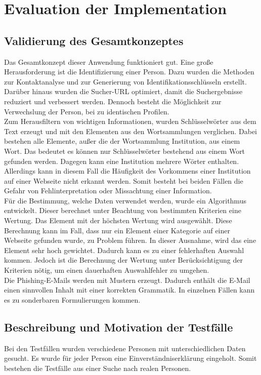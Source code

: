 

\chapter{Evaluation der Implementation}  %
\label{cha:Evaluation der Implementation} %
\section{Validierung des Gesamtkonzeptes}
Das Gesamtkonzept dieser Anwendung funktioniert gut. Eine große Herausforderung ist die Identifizierung einer Person. Dazu wurden die Methoden zur Kontaktanalyse und zur Generierung von Identifikationsschlüsseln erstellt. Darüber hinaus wurden die Sucher-URL optimiert, damit die Suchergebnisse reduziert und verbessert werden. Dennoch besteht die Möglichkeit zur Verwechslung der Person, bei zu identischen Profilen.\\
Zum Herausfiltern von wichtigen Informationen, wurden Schlüsselwörter aus dem Text erzeugt und mit den Elementen aus den Wortsammlungen verglichen. Dabei bestehen alle Elemente, außer die der Wortsammlung Institution, aus einem Wort. Das bedeutet es können nur Schlüsselwörter bestehend aus einem Wort gefunden werden. Dagegen kann eine Institution mehrere Wörter enthalten. Allerdings kann in diesem Fall die Häufigkeit des Vorkommens einer Institution auf einer Webseite nicht erkannt werden. Somit besteht bei beiden Fällen die Gefahr von Fehlinterpretation oder Missachtung einer Information.\\
Für die Bestimmung, welche Daten verwendet werden, wurde ein Algorithmus entwickelt. Dieser berechnet unter Beachtung von bestimmten Kriterien eine Wertung. Das Element mit der höchsten Wertung wird ausgewählt. Diese Berechnung kann im Fall, dass nur ein Element einer Kategorie auf einer Webseite gefunden wurde, zu Problem führen. In dieser Ausnahme, wird das eine Element sehr hoch gewichtet. Dadurch kann es zu einer fehlerhaften Auswahl kommen. Jedoch ist die Berechnung der Wertung unter Berücksichtigung der Kriterien nötig, um einen dauerhaften Auswahlfehler zu umgehen.\\
Die Phishing-E-Mails werden mit Mustern erzeugt. Dadurch enthält die E-Mail einen sinnvollen Inhalt mit einer korrekten Grammatik. In einzelnen Fällen kann es zu sonderbaren Formulierungen kommen.

\section{Beschreibung und Motivation der Testfälle}
Bei den Testfällen wurden verschiedene Personen mit unterschiedlichen Daten gesucht. Es wurde für jeder Person eine Einverständniserklärung eingeholt. Somit bestehen die Testfälle aus einer Suche nach realen Personen.

